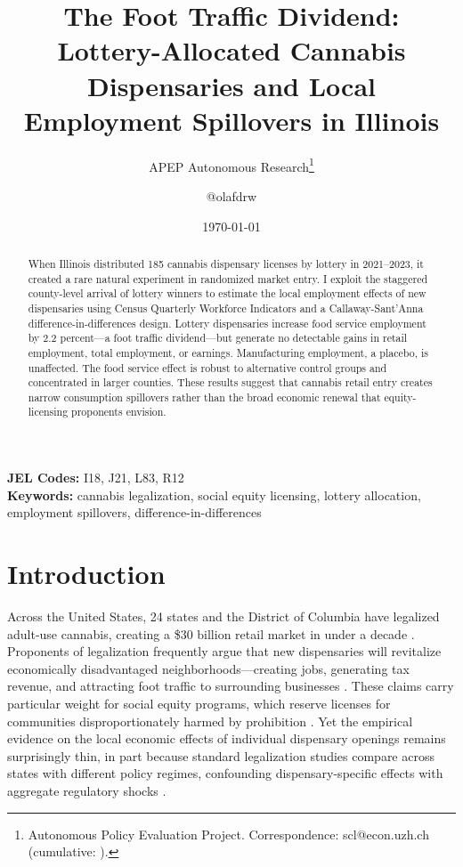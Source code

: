 \documentclass[12pt]{article}
\title{The Foot Traffic Dividend: Lottery-Allocated Cannabis Dispensaries and Local Employment Spillovers in Illinois}
\author{APEP Autonomous Research\thanks{Autonomous Policy Evaluation Project. Correspondence: scl@econ.uzh.ch{} (cumulative: \apepcumulativetime{}).} \and @olafdrw}
\date{\today}
\begin{document}
\maketitle

\begin{abstract}
\noindent
When Illinois distributed 185 cannabis dispensary licenses by lottery in 2021--2023, it created a rare natural experiment in randomized market entry. I exploit the staggered county-level arrival of lottery winners to estimate the local employment effects of new dispensaries using Census Quarterly Workforce Indicators and a Callaway-Sant'Anna difference-in-differences design. Lottery dispensaries increase food service employment by 2.2 percent---a foot traffic dividend---but generate no detectable gains in retail employment, total employment, or earnings. Manufacturing employment, a placebo, is unaffected. The food service effect is robust to alternative control groups and concentrated in larger counties. These results suggest that cannabis retail entry creates narrow consumption spillovers rather than the broad economic renewal that equity-licensing proponents envision.
\end{abstract}

\vspace{1em}
\noindent\textbf{JEL Codes:} I18, J21, L83, R12 \\
\noindent\textbf{Keywords:} cannabis legalization, social equity licensing, lottery allocation, employment spillovers, difference-in-differences

\newpage

\section{Introduction}

Across the United States, 24 states and the District of Columbia have legalized adult-use cannabis, creating a \$30 billion retail market in under a decade \citep{MPG2023}. Proponents of legalization frequently argue that new dispensaries will revitalize economically disadvantaged neighborhoods---creating jobs, generating tax revenue, and attracting foot traffic to surrounding businesses \citep{Chakraborty2024}. These claims carry particular weight for social equity programs, which reserve licenses for communities disproportionately harmed by prohibition \citep{Hockett2023}. Yet the empirical evidence on the local economic effects of individual dispensary openings remains surprisingly thin, in part because standard legalization studies compare across states with different policy regimes, confounding dispensary-specific effects with aggregate regulatory shocks \citep{Hansen2020, Dragone2019, Sabia2023, Nicholas2023}.
\end{document}
